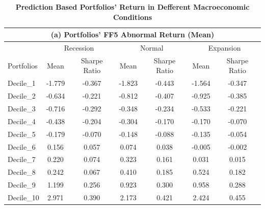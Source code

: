 \begin{table}[H]
  \centering
  \caption{\textbf{Prediction Based Portfolios' Return in Defferent Macroeconomic Conditions}}
  \begin{tabular}{l|cc|cc|cc}
  \hline
      \multicolumn{7}{c}{(a) Portfolios' FF5 Abnormal Return (Mean)}\\\hline
      ~ & \multicolumn{2}{c}{Recession} & \multicolumn{2}{c}{Normal} & \multicolumn{2}{c}{Expansion} \\ \cline{2-7}
      Portfolios & Mean & Sharpe Ratio & Mean & Sharpe Ratio & Mean & Sharpe Ratio \\ \hline
      Decile\_1 & -1.779 & -0.367 & -1.823 & -0.443 & -1.564 & -0.347 \\ 
      Decile\_2 & -0.634 & -0.221 & -0.812 & -0.407 & -0.925 & -0.385 \\ 
      Decile\_3 & -0.716 & -0.292 & -0.348 & -0.234 & -0.533 & -0.221 \\ 
      Decile\_4 & -0.438 & -0.204 & -0.304 & -0.170 & -0.170 & -0.070 \\ 
      Decile\_5 & -0.179 & -0.070 & -0.148 & -0.088 & -0.135 & -0.054 \\ 
      Decile\_6 & 0.156 & 0.057 & 0.074 & 0.038 & -0.005 & -0.002 \\ 
      Decile\_7 & 0.220 & 0.074 & 0.323 & 0.161 & 0.031 & 0.015 \\ 
      Decile\_8 & 0.242 & 0.067 & 0.410 & 0.185 & 0.524 & 0.182 \\ 
      Decile\_9 & 1.199 & 0.256 & 0.923 & 0.300 & 0.958 & 0.288 \\ 
      Decile\_10 & 2.971 & 0.390 & 2.173 & 0.421 & 2.424 & 0.455 \\  \hline


\end{tabular}
\end{table}
